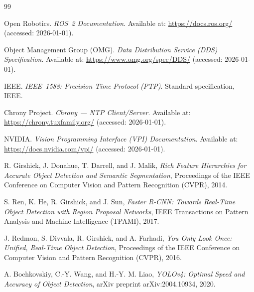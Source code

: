 \documentclass[12pt,a4paper]{report}
\begin{document}
{%

\renewcommand{\bibname}{References}
\begin{thebibliography}{99}

Open Robotics. \emph{ROS~2 Documentation}. Available at: \url{https://docs.ros.org/} (accessed: 2026-01-01).

Object Management Group (OMG). \emph{Data Distribution Service (DDS) Specification}. Available at: \url{https://www.omg.org/spec/DDS/} (accessed: 2026-01-01).

IEEE. \emph{IEEE~1588: Precision Time Protocol (PTP)}. Standard specification, IEEE.

Chrony Project. \emph{Chrony --- NTP Client/Server}. Available at: \url{https://chrony.tuxfamily.org/} (accessed: 2026-01-01).

NVIDIA. \emph{Vision Programming Interface (VPI) Documentation}. Available at: \url{https://docs.nvidia.com/vpi/} (accessed: 2026-01-01).

R. Girshick, J. Donahue, T. Darrell, and J. Malik,
\textit{Rich Feature Hierarchies for Accurate Object Detection and Semantic Segmentation},
Proceedings of the IEEE Conference on Computer Vision and Pattern Recognition (CVPR),
2014.

S. Ren, K. He, R. Girshick, and J. Sun,
\textit{Faster R-CNN: Towards Real-Time Object Detection with Region Proposal Networks},
IEEE Transactions on Pattern Analysis and Machine Intelligence (TPAMI),
2017.


J. Redmon, S. Divvala, R. Girshick, and A. Farhadi,
\textit{You Only Look Once: Unified, Real-Time Object Detection},
Proceedings of the IEEE Conference on Computer Vision and Pattern Recognition (CVPR),
2016.

A. Bochkovskiy, C.-Y. Wang, and H.-Y. M. Liao,
\textit{YOLOv4: Optimal Speed and Accuracy of Object Detection},
arXiv preprint arXiv:2004.10934,
2020.


\end{thebibliography}}
\end{document}
